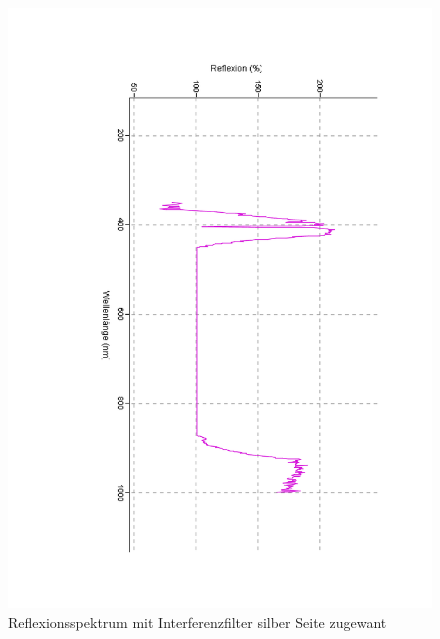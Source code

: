 \documentclass[12pt,a4paper]{article}
\begin{document}
\begin{figure}[H]
	\centering
	\includegraphics[scale=0.5,angle = 90,trim = 20mm 20mm 20mm 20mm]{./data/Spektro/Interferenzfilter_Silber_480nm.pdf}
	\caption{Reflexionsspektrum mit Interferenzfilter silber Seite zugewant}
	\label{fig:InterferenzSilber}
\end{figure}
\end{document}
